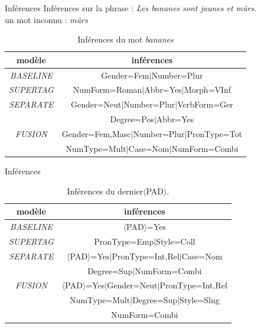 \documentclass[11pt]{beamer}
\begin{document}
\begin{frame}{Inférences}
    Inférences sur la phrase : \textit{Les bananes sont jaunes et mûrs.} \\
    un mot inconnu : \textit{mûrs}
    \begin{table}
        \centering
        \begin{tabular}{|c|c|}
            \hline
            \textbf{modèle} & \textbf{inférences} \\
            \hline
            \textit{BASELINE} & Gender=Fem$\mid$Number=Plur \\
            \hline
            \textit{SUPERTAG} & NumForm=Roman$\mid$Abbr=Yes$\mid$Morph=VInf\\
            \hline
            \textit{SEPARATE} & Gender=Neut$\mid$Number=Plur$\mid$VerbForm=Ger\\
             & Degree=Pos$\mid$Abbr=Yes\\
            \hline
            \textit{FUSION} & Gender=Fem,Masc$\mid$Number=Plur$\mid$PronType=Tot\\
             & NumType=Mult$\mid$Case=Nom$\mid$NumForm=Combi\\
            \hline
        \end{tabular}
        \caption{Inférences du mot \textit{bananes}}
    \end{table}
\end{frame}

\begin{frame}{Inférences}
    \begin{table}
        \centering
        \begin{tabular}{|c|c|}
            \hline
            \textbf{modèle} & \textbf{inférences} \\
            \hline
            \textit{BASELINE} & $\langle$PAD$\rangle$=Yes \\
            \hline
            \textit{SUPERTAG} & PronType=Emp$\mid$Style=Coll\\
            \hline
            \textit{SEPARATE} & $\langle$PAD$\rangle$=Yes$\mid$PronType=Int,Rel$\mid$Case=Nom\\
             & Degree=Sup$\mid$NumForm=Combi\\
            \hline
            \textit{FUSION} & $\langle$PAD$\rangle$=Yes$\mid$Gender=Neut$\mid$PronType=Int,Rel\\
             & NumType=Mult$\mid$Degree=Sup$\mid$Style=Slng\\
             & NumForm=Combi\\
            \hline
        \end{tabular}
        \caption{Inférences du dernier$\langle$PAD$\rangle$.}
    \end{table}
\end{frame}
\end{document}
